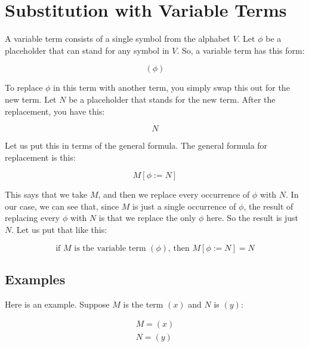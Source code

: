 \documentclass{book}
\numberwithin{equation}{chapter}
\begin{document}
\chapter{Substitution with Variable Terms}

A variable term consists of a single symbol from the alphabet $V$. Let $\phi$ be a placeholder that can stand for any symbol in $V$. So, a variable term has this form:

\begin{equation}
(\phi)
\end{equation}

\noindent
To replace $\phi$ in this term with another term, you simply swap this out for the new term. Let $N$ be a placeholder that stands for the new term. After the replacement, you have this:

\begin{equation}
N
\end{equation}

\noindent
Let us put this in terms of the general formula. The general formula for replacement is this:

\begin{equation}
M[\phi := N]
\end{equation}

\noindent
This says that we take $M$, and then we replace every occurrence of $\phi$ with $N$. In our case, we can see that, since $M$ is just a single occurrence of $\phi$, the result of replacing every $\phi$ with $N$ is that we replace the only $\phi$ here. So the result is just $N$. Let us put that like this:

\begin{equation}
\text{if $M$ is the variable term $(\phi)$, then $M[\phi := N] = N$}
\end{equation}


\section{Examples}

Here is an example. Suppose $M$ is the term $(x)$ and $N$ is $(y)$:

\begin{align}
M = (x) \\
N = (y)
\end{align}
\end{document}

